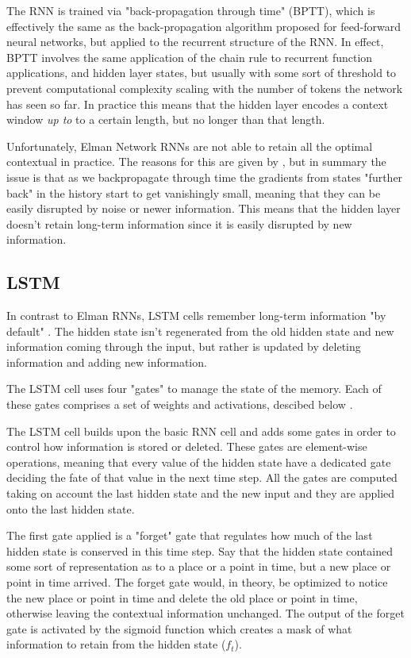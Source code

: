 \documentclass[a4paper]{article}
\begin{document}
The RNN is trained via "back-propagation through time" (BPTT), which is
effectively the same as the back-propagation algorithm proposed for feed-forward
neural networks, but applied to the recurrent structure of the RNN. In effect,
BPTT involves the same application of the chain rule to recurrent function
applications, and hidden layer states, but usually with some sort of threshold
to prevent computational complexity scaling with the number of tokens the
network has seen so far. In practice this means that the hidden layer encodes
a context window \emph{up to} to a certain length, but no longer than
that length.

Unfortunately, Elman Network RNNs are not able to retain all the optimal
contextual in practice. The reasons for this are given by \cite{Bengio94},
but in summary the issue is that as we backpropagate through time the gradients
from states "further back" in the history start to get vanishingly small, meaning
that they can be easily disrupted by noise or newer information. This means
that the hidden layer doesn't retain long-term information since it is easily
disrupted by new information.

\subsection{LSTM}
\label{sec:lstm}
In contrast to Elman RNNs, LSTM cells remember long-term information "by default" \cite{hochreiter97}.
The hidden state isn't regenerated from the old hidden state and new information coming
through the input, but rather is updated by deleting information and adding new
information.

The LSTM cell uses four "gates" to manage the state of the memory. Each of these
gates comprises a set of weights and activations, descibed below \cite{colah2015}.

The LSTM cell builds upon the basic RNN cell
and adds some gates in order to control how information is stored or deleted.
These gates are element-wise operations, meaning that every value of the hidden
state have a dedicated gate deciding the fate of that value in the next time
step. All the gates are computed taking on account the last hidden state and the
new input and they are applied onto the last hidden state.

The first gate applied is a "forget" gate that regulates how much of the last
hidden state is conserved in this time step. Say that the hidden state contained some
sort of representation as to a place or a point in time, but a new place or point in time arrived.
The forget gate would, in theory, be optimized to notice the new place or point in time and delete
the old place or point in time, otherwise leaving the contextual information unchanged. The output
of the forget gate is activated by the sigmoid function which creates a mask of what information
to retain from the hidden state ($f_t$).
\end{document}
